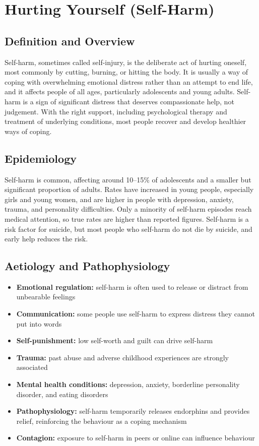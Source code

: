 \chapter{Hurting Yourself (Self-Harm)}

\section*{Definition and Overview}
Self-harm, sometimes called self-injury, is the deliberate act of hurting oneself, most commonly by cutting, burning, or hitting the body. It is usually a way of coping with overwhelming emotional distress rather than an attempt to end life, and it affects people of all ages, particularly adolescents and young adults. Self-harm is a sign of significant distress that deserves compassionate help, not judgement. With the right support, including psychological therapy and treatment of underlying conditions, most people recover and develop healthier ways of coping.

\section*{Epidemiology}
Self-harm is common, affecting around 10--15\% of adolescents and a smaller but significant proportion of adults. Rates have increased in young people, especially girls and young women, and are higher in people with depression, anxiety, trauma, and personality difficulties. Only a minority of self-harm episodes reach medical attention, so true rates are higher than reported figures. Self-harm is a risk factor for suicide, but most people who self-harm do not die by suicide, and early help reduces the risk.

\section*{Aetiology and Pathophysiology}
\begin{itemize}
    \item \textbf{Emotional regulation:} self-harm is often used to release or distract from unbearable feelings
    \item \textbf{Communication:} some people use self-harm to express distress they cannot put into words
    \item \textbf{Self-punishment:} low self-worth and guilt can drive self-harm
    \item \textbf{Trauma:} past abuse and adverse childhood experiences are strongly associated
    \item \textbf{Mental health conditions:} depression, anxiety, borderline personality disorder, and eating disorders
    \item \textbf{Pathophysiology:} self-harm temporarily releases endorphins and provides relief, reinforcing the behaviour as a coping mechanism
    \item \textbf{Contagion:} exposure to self-harm in peers or online can influence behaviour
\end{itemize}

